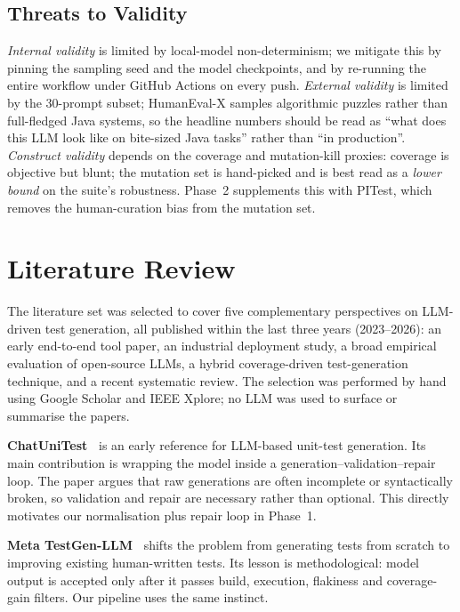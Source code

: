 \documentclass[journal]{IEEEtran}
\begin{document}
\subsection{Threats to Validity}

\emph{Internal validity} is limited by local-model non-determinism; we
mitigate this by pinning the sampling seed and the model checkpoints, and
by re-running the entire workflow under GitHub Actions on every push.
\emph{External validity} is limited by the 30-prompt subset; HumanEval-X
samples algorithmic puzzles rather than full-fledged Java systems, so the
headline numbers should be read as ``what does this LLM look like on
bite-sized Java tasks'' rather than ``in production''. \emph{Construct
validity} depends on the coverage and mutation-kill proxies: coverage is
objective but blunt; the mutation set is hand-picked and is best read as
a \emph{lower bound} on the suite's robustness. Phase~2 supplements this
with PITest, which removes the human-curation bias from the mutation set.

\section{Literature Review}\label{sec:lit}

The literature set was selected to cover five complementary perspectives
on LLM-driven test generation, all published within the last three years
(2023--2026): an early end-to-end tool paper, an industrial deployment
study, a broad empirical evaluation of open-source LLMs, a hybrid
coverage-driven test-generation technique, and a recent systematic
review. The selection was performed by hand using Google Scholar and IEEE
Xplore; no LLM was used to surface or summarise the papers.

\textbf{ChatUniTest~\cite{chatunitest}} is an early reference for LLM-based
unit-test generation. Its main contribution is wrapping the model inside
a generation--validation--repair loop. The paper argues that raw
generations are often incomplete or syntactically broken, so validation
and repair are necessary rather than optional. This directly motivates
our normalisation plus repair loop in Phase~1.

\textbf{Meta TestGen-LLM~\cite{metatestgen}} shifts the problem from
generating tests from scratch to improving existing human-written tests.
Its lesson is methodological: model output is accepted only after it
passes build, execution, flakiness and coverage-gain filters. Our
pipeline uses the same instinct.
\end{document}
